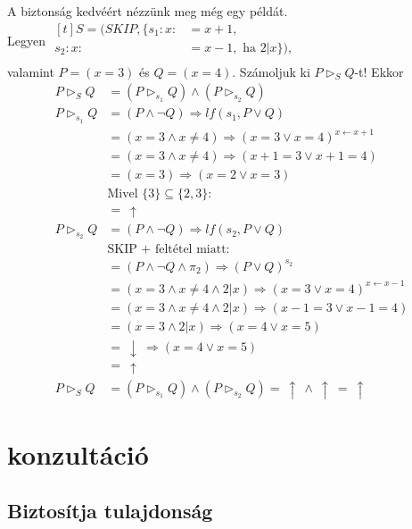 \documentclass[12pt]{article}
\begin{document}
	A biztonság kedvéért nézzünk meg még egy példát. \\
	Legyen $\begin{aligned}[t]
	S = (SKIP, \{
	s_1: x :&= x+1, \\
	s_2: x :&= x-1, \text{ ha } 2|x \}), \\
	\end{aligned}$ \\
	valamint $P = (x=3)$ és $Q = (x=4)$. Számoljuk ki $P \vartriangleright_S Q$-t! Ekkor
	\begin{align*}
	P \vartriangleright_S Q &= (P \vartriangleright_{s_1} Q) \land (P \vartriangleright_{s_2} Q) \\
	P \vartriangleright_{s_1} Q &= (P \land \neg Q) \Rightarrow lf(s_1, P \lor Q) \\
	&= (x = 3 \land x \neq 4) \Rightarrow (x=3 \lor x=4)^{x \leftarrow x+1} \\
	&= (x = 3 \land x \neq 4) \Rightarrow (x+1=3 \lor x+1=4) \\
	&= (x = 3) \Rightarrow (x=2 \lor x=3) \\
	&\text{Mivel } \{3\} \subseteq \{2, 3\}: \\
	&=\ \uparrow \\
	P \vartriangleright_{s_2} Q &= (P \land \neg Q) \Rightarrow lf(s_2, P \lor Q) \\
	&\text{SKIP + feltétel miatt:} \\
	&= (P \land \neg Q \land \pi_2) \Rightarrow (P \lor Q)^{s_2} \\
	&= (x=3 \land x \neq 4 \land 2|x) \Rightarrow (x=3 \lor x=4)^{x \leftarrow x-1} \\
	&= (x=3 \land x \neq 4 \land 2|x) \Rightarrow (x-1=3 \lor x-1=4) \\
	&= (x=3 \land 2|x) \Rightarrow (x=4 \lor x=5) \\
	&=\ \downarrow\ \Rightarrow (x=4 \lor x=5) \\
	&=\ \uparrow \\
	P \vartriangleright_S Q &= (P \vartriangleright_{s_1} Q) \land (P \vartriangleright_{s_2} Q) =\ \uparrow\ \land\ \uparrow\ =\ \uparrow
	\end{align*}
	
	\section{konzultáció}
	\subsection{Biztosítja tulajdonság}
\end{document}
